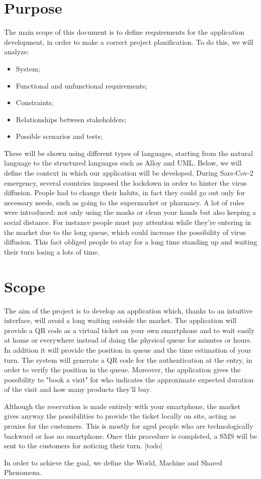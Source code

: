 \section{Purpose}
The main scope of this document is to define requirements for the application development, in order to make a correct project planification. 
To do this, we will analyze:

\begin{itemize}
\item System;
\item Functional and unfunctional requirements;
\item Constraints;
\item Relationships between stakeholders;
\item Possible scenarios and tests;
\end{itemize}
\medskip
These will be shown using different types of languages, starting from the natural language to the structured languages such as Alloy and UML.
Below, we will define the context in which our application will be developed.
During Sars-Cov-2 emergency, several countries imposed the lockdown in order to hinter the virus diffusion.
People had to change their habits, in fact they could go out only for necessary needs, such as going to the supermarket or pharmacy.
A lot of rules were introduced: not only using the masks or clean your hands but also keeping a social distance.
For instance people must pay attention while they're entering in the market due to the long queue, which could increase the possibility of virus diffusion.
This fact obliged people to stay for a long time standing up and waiting their turn losing a lots of time. 




\section{Scope}

The aim of the project is to develop an application which, thanks to an intuitive interface, will avoid a long waiting outside the market.
The application will provide a QR code as a virtual ticket on your own smartphone and to wait easily at home or everywhere instead of doing the physical queue for minutes or hours. 
In addition it will provide the position in queue and the time estimation of your turn.
The system will generate a QR code for the authentication at the entry, in order to verify the position in the queue. 
Moreover, the application gives the possibility to "book a visit" for who indicates the approximate expected duration of the visit and how many products they'll buy. \par \medskip
Although the reservation is made entirely with your smartphone, the market gives anyway the possibilities to provide the ticket locally on site, acting as proxies for the customers. This is mostly for aged people who are technologically backward or has no smartphone.
Once this procedure is completed, a SMS will be sent to the customers for noticing their turn. [todo]\par \medskip
In order to achieve the goal, we define the World, Machine and Shared Phenomena.
